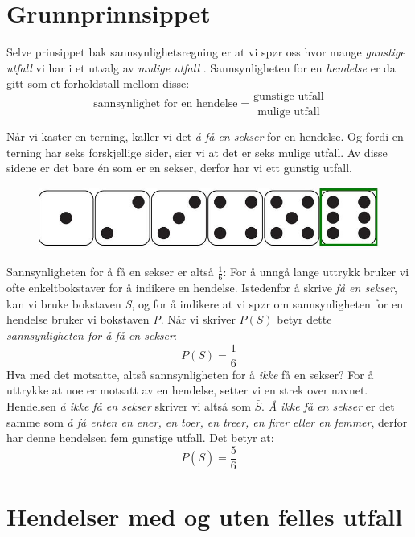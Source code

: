 

%


\section{Grunnprinnsippet}
\setlength\itemsep{0 pt}
Selve prinsippet bak sannsynlighetsregning er at vi spør oss hvor mange \textit{gunstige utfall}  vi har i et utvalg av \textit{mulige utfall} . Sannsynligheten for en \textit{hendelse} er da gitt som et forholdstall mellom disse:
$$\text{sannsynlighet for en hendelse}=\frac{\text{gunstige utfall}}{\text{mulige utfall}}$$

Når vi kaster en terning, kaller vi det \textit{å få en sekser} for en hendelse. Og fordi en terning har seks forskjellige sider, sier vi at det er seks mulige utfall. Av disse sidene er det bare én som er en sekser, derfor har vi ett gunstig utfall. 
\begin{figure}[H]
	\centering
	\includegraphics[scale=0.3]{tern}
\end{figure}Sannsynligheten for å få en sekser er altså $ \frac{1}{6} $:
For å unngå lange uttrykk bruker vi ofte enkeltbokstaver for å indikere en hendelse. Istedenfor å skrive \textit{få en sekser}, kan vi bruke bokstaven \textit{S}, og for å indikere at vi spør om sannsynligheten for en hendelse bruker vi bokstaven \textit{P}. Når vi skriver $P(S)$ betyr dette \textit{sannsynligheten for å få en sekser}:
\[ P(S)=\frac{1}{6} \]
Hva med det motsatte, altså sannsynligheten for å \textsl{ikke} få en sekser? For å uttrykke at noe er motsatt av en hendelse, setter vi en strek over navnet. Hendelsen \textit{å ikke få en sekser} skriver vi altså som $ \bar{S} $. \textit{Å ikke få en sekser} er det samme som \textit{å få enten en ener, en toer, en treer, en firer eller en femmer}, derfor har denne hendelsen fem gunstige utfall. Det betyr at:
\[ P(\bar{S})=\frac{5}{6} \]
\section{Hendelser med og uten felles utfall}
